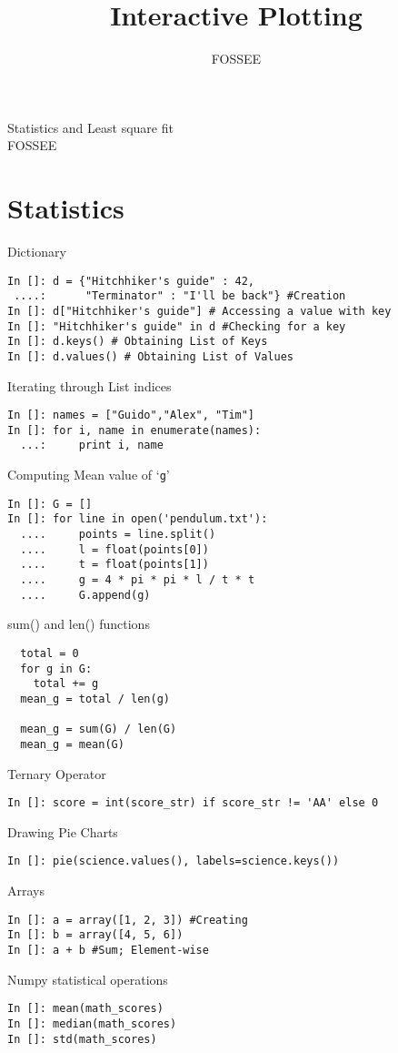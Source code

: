 \documentclass[12pt]{article}
\title{Interactive Plotting}
\author{FOSSEE}
\begin{document}
\date{}
\vspace{-1in}
\begin{center}
\LARGE{Statistics and Least square fit}\\
\large{FOSSEE}
\end{center}
\section{Statistics}
Dictionary
\begin{lstlisting}
In []: d = {"Hitchhiker's guide" : 42, 
 ....:      "Terminator" : "I'll be back"} #Creation
In []: d["Hitchhiker's guide"] # Accessing a value with key
In []: "Hitchhiker's guide" in d #Checking for a key
In []: d.keys() # Obtaining List of Keys
In []: d.values() # Obtaining List of Values
\end{lstlisting}
Iterating through List indices
\begin{lstlisting}
In []: names = ["Guido","Alex", "Tim"]
In []: for i, name in enumerate(names):
  ...:     print i, name
\end{lstlisting}
Computing Mean value of `\texttt{g}'
\begin{lstlisting}
In []: G = []
In []: for line in open('pendulum.txt'):
  ....     points = line.split()
  ....     l = float(points[0])
  ....     t = float(points[1])
  ....     g = 4 * pi * pi * l / t * t
  ....     G.append(g)
\end{lstlisting}
sum() and len() functions
\begin{lstlisting}
  total = 0
  for g in G:
    total += g
  mean_g = total / len(g)

  mean_g = sum(G) / len(G)
  mean_g = mean(G)
\end{lstlisting}
\newpage
Ternary Operator
\begin{lstlisting}
In []: score = int(score_str) if score_str != 'AA' else 0
\end{lstlisting}
Drawing Pie Charts
\begin{lstlisting}
In []: pie(science.values(), labels=science.keys())
\end{lstlisting}
Arrays
\begin{lstlisting}
In []: a = array([1, 2, 3]) #Creating
In []: b = array([4, 5, 6])
In []: a + b #Sum; Element-wise
\end{lstlisting}
Numpy statistical operations 
\begin{lstlisting}
In []: mean(math_scores) 
In []: median(math_scores)
In []: std(math_scores)
\end{lstlisting}
\end{document}
